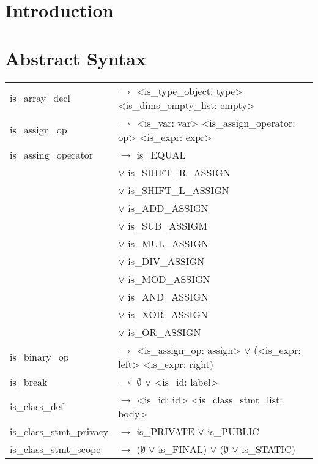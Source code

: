 \documentclass[a4paper]{article}
\title{\documentTitle}
\author{\documentAuthors{}}
\begin{document}
\renewcommand{\figurename}{Figure}
\maketitle
\cleardoublepage

\tableofcontents
\cleardoublepage

\setlength{\parindent}{1cm}
\setlength{\parskip}{0.3cm}

\section{Introduction}
\section{Abstract Syntax}
\begin{tabular}{ll}
	is\_array\_decl 			& $\to$ <is\_type\_object: type> <is\_dims\_empty\_list: empty> \\
	is\_assign\_op				& $\to$ <is\_var: var> <is\_assign\_operator: op> <is\_expr: expr> \\
	is\_assing\_operator		& $\to$ is\_EQUAL \\
								& $\vee$ is\_SHIFT\_R\_ASSIGN \\
								& $\vee$ is\_SHIFT\_L\_ASSIGN \\
								& $\vee$ is\_ADD\_ASSIGN \\
								& $\vee$ is\_SUB\_ASSIGM \\
								& $\vee$ is\_MUL\_ASSIGN \\
								& $\vee$ is\_DIV\_ASSIGN \\
								& $\vee$ is\_MOD\_ASSIGN \\
								& $\vee$ is\_AND\_ASSIGN \\
								& $\vee$ is\_XOR\_ASSIGN \\
								& $\vee$ is\_OR\_ASSIGN \\
	is\_binary\_op				& $\to$ <is\_assign\_op: assign> $\vee$ (<is\_expr: left> <is\_expr: right) \\
	is\_break 					& $\to$ $\emptyset$ $\vee$ <is\_id: label> \\
	is\_class\_def				& $\to$ <is\_id: id> <is\_class\_stmt\_list: body> \\
	is\_class\_stmt\_privacy	& $\to$ is\_PRIVATE $\vee$ is\_PUBLIC\\	
	is\_class\_stmt\_scope		& $\to$ ($\emptyset$ $\vee$ is\_FINAL) $\vee$ ($\emptyset$ $\vee$ is\_STATIC) \\

\end{tabular}
\end{document}
